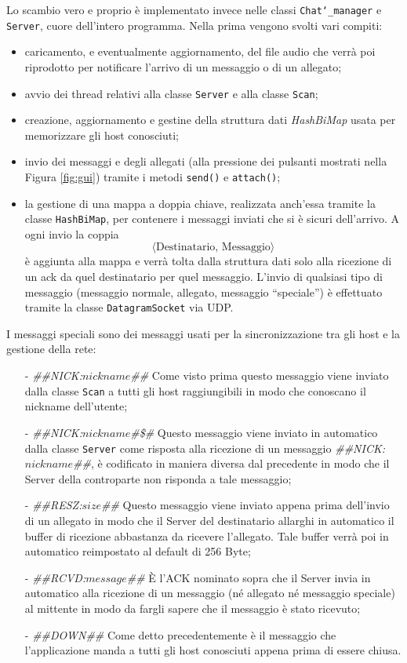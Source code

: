 Lo scambio vero e proprio è implementato invece nelle classi \texttt{Chat\char`_manager} e \texttt{Server},
cuore dell'intero programma. Nella prima vengono svolti vari compiti:
\begin{itemize}
	\item caricamento, e eventualmente aggiornamento, del file audio che verrà poi riprodotto per notificare 
	l'arrivo di un messaggio o di un allegato;
	\item avvio dei thread relativi alla classe \texttt{Server} e alla classe \texttt{Scan};
	\item creazione, aggiornamento e gestine della struttura dati \emph{HashBiMap} usata per memorizzare gli host
	conosciuti;
	\item invio dei messaggi e degli allegati (alla pressione dei pulsanti mostrati nella Figura \ref{fig:gui})
	tramite i metodi \texttt{send()} e \texttt{attach()};
	\item la gestione di una mappa a doppia chiave, realizzata anch'essa tramite la classe \texttt{HashBiMap},
	per contenere i messaggi inviati che si è sicuri dell'arrivo. A ogni invio la coppia
	$$ \langle \text{Destinatario, Messaggio} \rangle$$
	è aggiunta alla mappa e verrà tolta dalla struttura dati solo alla ricezione di un ack da quel destinatario
	per quel messaggio. L'invio di qualsiasi tipo di messaggio (messaggio normale, allegato, messaggio ``speciale'')
	è effettuato tramite la classe \texttt{DatagramSocket} via UDP.
\end{itemize}
I messaggi speciali sono dei messaggi usati per la sincronizzazione tra gli host e la gestione della rete:
\begin{itemize}
	\item[-] \emph{\#\#NICK:$nickname$\#\#} Come visto prima questo messaggio viene inviato dalla classe
	\texttt{Scan} a tutti gli host raggiungibili in modo che conoscano il nickname dell'utente;
	\item[-] \emph{\#\#NICK:$nickname$\#\$\#} Questo messaggio viene inviato in automatico dalla classe 
	\texttt{Server} come risposta alla ricezione di un messaggio \emph{\#\#NICK:$nickname$\#\#}, è codificato
	in maniera diversa dal 	precedente in modo che il Server della controparte non risponda a tale messaggio;
	\item[-] \emph{\#\#RESZ:$size$\#\#} Questo messaggio viene inviato appena prima dell'invio di un allegato in 
	modo che il Server del destinatario allarghi in automatico il buffer di ricezione abbastanza da ricevere 
	l'allegato. Tale buffer verrà poi in automatico reimpostato al default di 256 Byte;
	\item[-] \emph{\#\#RCVD:$message$\#\#} È l'ACK nominato sopra che il Server invia in automatico alla ricezione 	
	di un messaggio (né allegato né messaggio speciale) al mittente in modo da fargli sapere che il messaggio è 
	stato ricevuto;
	\item[-] \emph{\#\#DOWN\#\#} Come detto precedentemente è il messaggio che l'applicazione manda a tutti gli 
	host conosciuti appena prima di essere chiusa.
\end{itemize}

